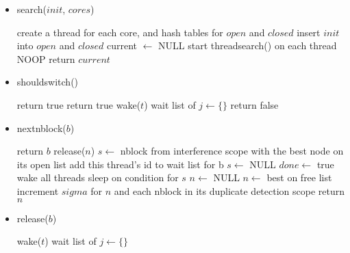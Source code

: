 \documentclass{article}
\begin{document}
\begin{itemize}
  \item search($init$, $cores$)
  \begin{algorithmic}[1]
  \STATE create a thread for each core, and hash tables for $open$ and $closed$
  \STATE insert $init$ into $open$ and $closed$
  \STATE current $\leftarrow$ NULL
  \STATE start threadsearch() on each thread
    \STATE NOOP
  \ENDWHILE
  \STATE return $current$
  \end{algorithmic}
  
  \item shouldswitch()
  \begin{algorithmic}[1]
  \STATE {}
    \STATE return true
    \STATE return true
  \ELSE
        \STATE wake($t$)
      \ENDFOR
      \STATE wait list of $j \leftarrow \{\}$
    \ENDFOR
    \STATE return false
  \ENDIF
  \end{algorithmic}

  \item nextnblock($b$)
  \begin{algorithmic}[1]
      \STATE return $b$
    \ENDIF
    \STATE release($n$)
    \STATE $s \leftarrow$ nblock from interference scope with the best node on its open list
      \STATE add this thread's id to wait list for b
    \ELSE
      \STATE $s \leftarrow$ NULL
    \ENDIF
  \ENDIF
    \STATE $done \leftarrow$ true
    \STATE wake all threads
  \ENDIF
    \STATE sleep on condition for $s$
  \ENDWHILE
    \STATE $n \leftarrow$ NULL
  \ELSE
    \STATE $n \leftarrow$ best on free list
    \STATE increment $sigma$ for $n$ and each nblock in its duplicate detection scope
  \ENDIF
  \STATE return $n$
  \end{algorithmic}

  \item release($b$)
  \begin{algorithmic}[1]
      \STATE wake($t$)
    \ENDFOR
    \STATE wait list of $j \leftarrow \{\}$
  \ENDFOR
  \end{algorithmic}


\end{itemize}
\end{document}
